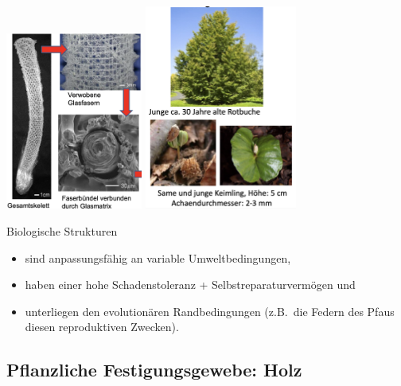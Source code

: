 \begin{center}
    \includegraphics[width=4.5cm]{lec6/figures/Glasschwamm.png}
    \hfill
    \includegraphics[width=5cm]{lec6/figures/Rotbuche.png}
\end{center}
Biologische Strukturen
\begin{itemize}
    \item sind anpassungsfähig an variable Umweltbedingungen,
    \item haben einer hohe Schadenstoleranz + Selbstreparaturvermögen und
    \item unterliegen den evolutionären Randbedingungen (z.B.\ die Federn des Pfaus diesen reproduktiven Zwecken).
\end{itemize}

\subsection{Pflanzliche Festigungsgewebe: Holz}

